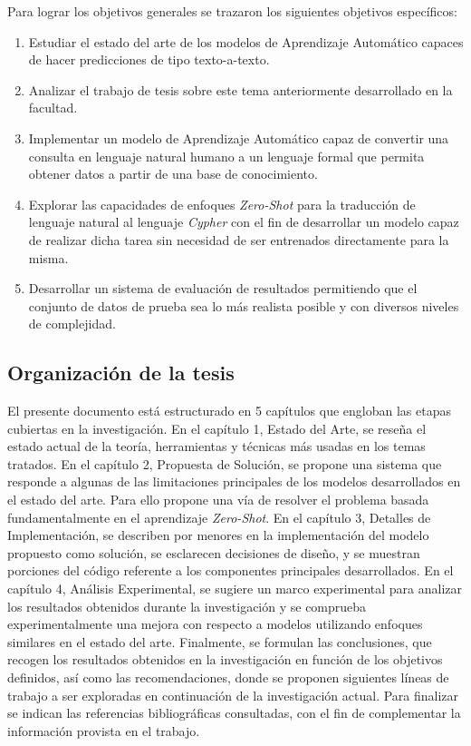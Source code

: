 Para lograr los objetivos generales se trazaron los siguientes objetivos específicos:

\begin{enumerate}
	\item Estudiar el estado del arte de los modelos de Aprendizaje Automático capaces de hacer predicciones de tipo texto-a-texto.
	\item Analizar el trabajo de tesis sobre este tema anteriormente desarrollado en la facultad.
	\item Implementar un modelo de Aprendizaje Automático capaz de convertir una consulta en lenguaje natural humano a un lenguaje formal que permita obtener datos a partir de una 		base de conocimiento.
	\item Explorar las capacidades de enfoques \textit{Zero-Shot} para la traducción de lenguaje natural al lenguaje \textit{Cypher} con el fin de desarrollar un modelo capaz de realizar dicha tarea sin necesidad de ser entrenados directamente para la misma.
	\item Desarrollar un sistema de evaluación de resultados permitiendo que el conjunto de datos de prueba sea lo más realista posible y con diversos niveles de complejidad.
\end{enumerate}

\subsection*{Organización de la tesis}

El presente documento está estructurado en 5 capítulos que engloban las etapas cubiertas en la investigación. En el capítulo 1, Estado del Arte, se reseña el estado actual de la teoría, herramientas y técnicas más usadas en los temas tratados. En el capítulo 2, Propuesta de Solución, se propone una sistema que responde a algunas de las limitaciones principales de los modelos desarrollados en el estado del arte. Para ello propone una vía de resolver el problema basada fundamentalmente en el aprendizaje \textit{Zero-Shot}. En el capítulo 3, Detalles de Implementación, se describen por menores en la implementación del modelo propuesto como solución, se esclarecen decisiones de diseño, y se muestran porciones del código referente a los componentes principales desarrollados. En el capítulo 4, Análisis Experimental, se sugiere un marco experimental para analizar los resultados obtenidos durante la investigación y se comprueba experimentalmente una mejora con respecto a modelos utilizando enfoques similares en el estado del arte. Finalmente, se formulan las conclusiones, que recogen los resultados obtenidos en la investigación en función de los objetivos definidos, así como las recomendaciones, donde se proponen siguientes líneas de trabajo a ser exploradas en continuación de la investigación actual. Para finalizar se indican las referencias bibliográficas consultadas, con el fin de complementar la información provista en el trabajo.



